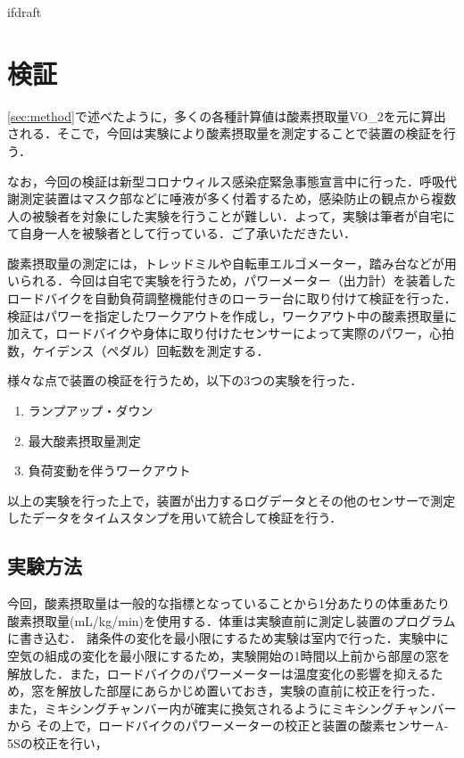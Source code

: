 \expandafter\ifx\csname ifdraft\endcsname\relax
 
\fi

\section{検証}

\ref{sec:method}で述べたように，多くの各種計算値は酸素摂取量VO_2を元に算出される．そこで，今回は実験により酸素摂取量を測定することで装置の検証を行う．

なお，今回の検証は新型コロナウィルス感染症緊急事態宣言中に行った．呼吸代謝測定装置はマスク部などに唾液が多く付着するため，感染防止の観点から複数人の被験者を対象にした実験を行うことが難しい．よって，実験は筆者が自宅にて自身一人を被験者として行っている．ご了承いただきたい．

酸素摂取量の測定には，トレッドミルや自転車エルゴメーター，踏み台などが用いられる．今回は自宅で実験を行うため，パワーメーター（出力計）を装着したロードバイクを自動負荷調整機能付きのローラー台に取り付けて検証を行った．
検証はパワーを指定したワークアウトを作成し，ワークアウト中の酸素摂取量に加えて，ロードバイクや身体に取り付けたセンサーによって実際のパワー，心拍数，ケイデンス（ペダル）回転数を測定する．

様々な点で装置の検証を行うため，以下の3つの実験を行った．

\begin{enumerate}
  \item ランプアップ・ダウン
  \item 最大酸素摂取量測定
  \item 負荷変動を伴うワークアウト
\end{enumerate}

以上の実験を行った上で，装置が出力するログデータとその他のセンサーで測定したデータをタイムスタンプを用いて統合して検証を行う．

\subsection{実験方法}

今回，酸素摂取量は一般的な指標となっていることから1分あたりの体重あたり酸素摂取量(mL/kg/min)を使用する．体重は実験直前に測定し装置のプログラムに書き込む．
諸条件の変化を最小限にするため実験は室内で行った．実験中に空気の組成の変化を最小限にするため，実験開始の1時間以上前から部屋の窓を解放した．また，ロードバイクのパワーメーターは温度変化の影響を抑えるため，窓を解放した部屋にあらかじめ置いておき，実験の直前に校正を行った．
また，ミキシングチャンバー内が確実に換気されるようにミキシングチャンバーから
その上で，ロードバイクのパワーメーターの校正と装置の酸素センサーA-5Sの校正を行い，

